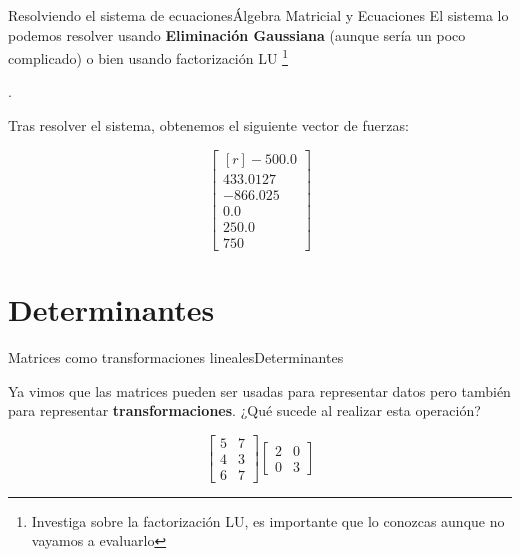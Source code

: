 \documentclass[spanish, c]{beamer}
\newcommand\blfootnote[1]{%
\begingroup
\renewcommand\thefootnote{}\footnote{#1}%
\addtocounter{footnote}{-1}%
\endgroup
}
\begin{document}
\begin{frame}{Resolviendo el sistema de ecuaciones}{Álgebra Matricial y Ecuaciones}
    El sistema lo podemos resolver usando \textbf{Eliminación Gaussiana} (aunque sería un poco complicado) o bien usando \alert{factorización LU}\blfootnote{Investiga sobre la factorización LU, es importante que lo conozcas aunque no vayamos a evaluarlo}.

    Tras resolver el sistema, obtenemos el siguiente vector de fuerzas:

    $$ \begin{bmatrix*}[r] -500.0 \\ 433.0127 \\ -866.025 \\ 0.0 \\ 250.0 \\ 750\end{bmatrix*} $$

\end{frame}

\section{Determinantes}

\begin{frame}{Matrices como transformaciones lineales}{Determinantes}

    Ya vimos que las matrices pueden ser usadas para representar datos pero también para representar \textbf{transformaciones}. ¿Qué sucede al realizar esta operación? \pause

    $$\begin{bmatrix*}
        5 & 7 \\ 4 & 3 \\ 6 & 7
    \end{bmatrix*}
    \begin{bmatrix*}
        2 & 0 \\
        0 & 3
    \end{bmatrix*}$$

\end{frame}
\end{document}
